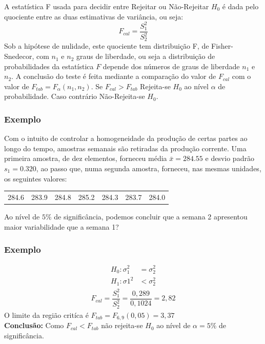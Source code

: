 \documentclass[14pt,aspectratio=1610]{beamer}
\newcommand{\bx}{\ensuremath{\bar{x}}}
\newcommand{\Ho}{\ensuremath{H_{0}}}
\begin{document}
\begin{frame}{}
\frametitle{}
\begin{block}{}
\justifying
A estatística F usada para decidir entre Rejeitar ou Não-Rejeitar $\Ho$ é dada pelo quociente entre as duas estimativas de variância, ou seja:
$$F_{cal}=\dfrac{S_{1}^{2}}{S_{2}^{2}}$$
Sob a hipótese de nulidade, este quociente tem distribuição F, de Fisher-Snedecor, com $n_{1}$ e $n_{2}$ graus de liberdade, ou seja a distribuição de probabilidades 
da estatística $F$ depende dos números de graus de liberdade $n_{1}$ e $n_{2}$. A conclusão do teste é feita mediante a comparação do valor de $F_{cal}$ com o 
valor de $F_{tab}=F_{\alpha}(n_{1},n_{2}).$ Se $F_{cal}>F_{tab}$ Rejeita-se $\Ho$ ao nível $\alpha$ de probabilidade. Caso contrário Não-Rejeita-se $\Ho.$
\end{block}
\end{frame}

\begin{frame}{}
\frametitle{Exemplo}
\small
\begin{block}{}
\justifying
Com o intuito de controlar a homogeneidade da produção de certas partes ao longo do tempo, amostras semanais são retiradas da produção corrente. Uma primeira 
amostra, de dez elementos, forneceu média $\bx=284.55$ e desvio padrão $s_{1}=0.320$, ao passo que, numa segunda amostra, forneceu, nas mesmas unidades, os seguintes valores:
\begin{table}[]
\begin{tabular}{ccccccc}
             284.6 & 283.9 & 284.8 & 285.2 & 284.3 & 283.7 & 284.0\\ 
\end{tabular}
\end{table}
Ao nível de $5\%$ de significância, podemos concluir que a semana 2 apresentou maior variabilidade que a semana 1?
\end{block}
\end{frame}

\begin{frame}{}
\frametitle{Exemplo}
\begin{block}{}
\justifying
\begin{align*}
H_{0}: \sigma_{1}^{2}&=\sigma_{2}^{2} \\ 
H_{1}: \sigma{1}^{2}&<\sigma_{2}^{2}
\end{align*}
\begin{align}
F_{cal}=\dfrac{S_{1}^{2}}{S_{2}^{2}}=\dfrac{0,289}{0,1024}=2,82
\end{align}
O limite da região critíca é $F_{tab}=F_{6,9}(0,05)=3,37$\\
\textbf{Conclusão:} Como $F_{cal}<F_{tab}$ não rejeita-se $\Ho$ ao nível de $\alpha=5\%$ de significância. 
\end{block}
\end{frame}
\end{document}
